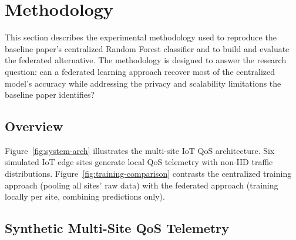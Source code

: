 
\section{Methodology}
\label{sec:Methodology}

This section describes the experimental methodology used to reproduce the baseline paper's centralized Random Forest classifier and to build and evaluate the federated alternative. The methodology is designed to answer the research question: can a federated learning approach recover most of the centralized model's accuracy while addressing the privacy and scalability limitations the baseline paper identifies?

\subsection{Overview}
\label{subsec:method-overview}

Figure~\ref{fig:system-arch} illustrates the multi-site IoT QoS architecture. Six simulated IoT edge sites generate local QoS telemetry with non-IID traffic distributions. Figure~\ref{fig:training-comparison} contrasts the centralized training approach (pooling all sites' raw data) with the federated approach (training locally per site, combining predictions only).

% 
% 
% 

\subsection{Synthetic Multi-Site QoS Telemetry}
\label{subsec:telemetry}

